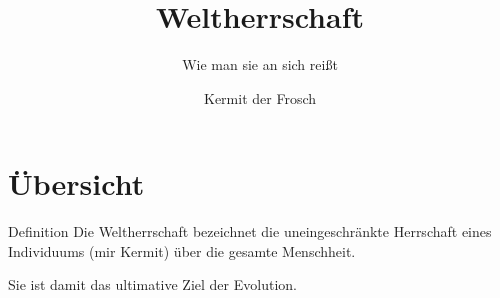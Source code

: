 \documentclass[11pt]{beamer}
\begin{document}
	\author{Kermit der Frosch}
	\title{Weltherrschaft}
	\subtitle{Wie man sie an sich reißt}

\begin{frame}	
	\maketitle
\end{frame}

\section{Übersicht}
\begin{frame}{Definition}
	Die Weltherrschaft bezeichnet die uneingeschränkte Herrschaft eines Individuums (mir Kermit) über die gesamte Menschheit.\par\vspace{5mm}
	Sie ist damit das ultimative Ziel der Evolution.
\end{frame}
\end{document}

